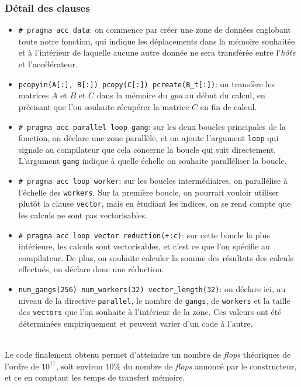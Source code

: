 \documentclass{article}
\begin{document}
\subsubsection{Détail des clauses}

\begin{itemize}

	\item \texttt{\# pragma acc data}: on commence par créer une zone de données englobant toute notre fonction, qui indique les déplacements dans la mémoire souhaitée et à l'intérieur de laquelle aucune autre donnée ne sera transférée entre l'\textit{hôte} et l'accélérateur.
	\item \texttt{pcopyin(A[:], B[:]) pcopy(C[:]) pcreate(B\_t[:])}: on transfère les matrices $A$ et $B$ et $C$ dans la mémoire du \textit{\gls{gpu}} au début du calcul, en précisant que l'on souhaite récupérer la matrice $C$ en fin de calcul.
	\item \texttt{\# pragma acc parallel loop gang}: sur les deux boucles principales de la fonction, on déclare une zone parallèle, et on ajoute l'argument \texttt{loop} qui signale au compilateur que cela concerne la boucle qui suit directement. L'argument \texttt{gang} indique à quelle échelle on souhaite paralléliser la boucle.
	\item \texttt{\# pragma acc loop worker}: sur les boucles intermédiaires, on parallélise à l'échelle des \texttt{workers}. Sur la première boucle, on pourrait vouloir utiliser plutôt la clause \texttt{vector}, mais en étudiant les indices, on se rend compte que les calculs ne sont pas vectorisables.
	\item \texttt{\# pragma acc loop vector reduction(+:c)}: sur cette boucle la plus intérieure, les calculs sont vectorisables, et c'est ce que l'on spécifie au compilateur. De plus, on souhaite calculer la somme des résultats des calculs effectués, on déclare donc une réduction.
	\item \texttt{num\_gangs(256) num\_workers(32) vector\_length(32)}: on déclare ici, au niveau de la directive \texttt{parallel}, le nombre de \texttt{gangs}, de \texttt{workers} et la taille des \texttt{vectors} que l'on souhaite à l'intérieur de la zone. Ces valeurs ont été déterminées empiriquement et peuvent varier d'un code à l'autre.

\end{itemize}

~\\

Le code finalement obtenu permet d'atteindre un nombre de \textit{\gls{flops}} théoriques de l'ordre de $10^{11}$, soit environ $10\%$ du nombre de \textit{\gls{flops}} annoncé par le constructeur, et ce en comptant les temps de transfert mémoire.
\end{document}
